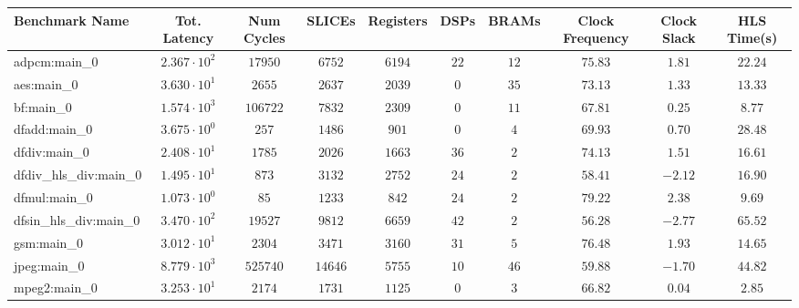 \begin{tabular}{|l|c|c|c|c|c|c|c|c|c|}
\hline
Benchmark Name          & Tot. Latency           & Num Cycles & SLICEs    & Registers & DSPs    & BRAMs   & Clock Frequency & Clock Slack & HLS Time(s) \\
\hline
adpcm:main\_0           & $ 2.367 \cdot 10^{2} $ & $ 17950  $ & $ 6752  $ & $ 6194  $ & $ 22  $ & $ 12  $ & $ 75.83       $ & $ 1.81    $ & $ 22.24   $ \\
aes:main\_0             & $ 3.630 \cdot 10^{1} $ & $ 2655   $ & $ 2637  $ & $ 2039  $ & $ 0   $ & $ 35  $ & $ 73.13       $ & $ 1.33    $ & $ 13.33   $ \\
bf:main\_0              & $ 1.574 \cdot 10^{3} $ & $ 106722 $ & $ 7832  $ & $ 2309  $ & $ 0   $ & $ 11  $ & $ 67.81       $ & $ 0.25    $ & $ 8.77    $ \\
dfadd:main\_0           & $ 3.675 \cdot 10^{0} $ & $ 257    $ & $ 1486  $ & $ 901   $ & $ 0   $ & $ 4   $ & $ 69.93       $ & $ 0.70    $ & $ 28.48   $ \\
dfdiv:main\_0           & $ 2.408 \cdot 10^{1} $ & $ 1785   $ & $ 2026  $ & $ 1663  $ & $ 36  $ & $ 2   $ & $ 74.13       $ & $ 1.51    $ & $ 16.61   $ \\
dfdiv\_hls\_div:main\_0 & $ 1.495 \cdot 10^{1} $ & $ 873    $ & $ 3132  $ & $ 2752  $ & $ 24  $ & $ 2   $ & $ 58.41       $ & $ -2.12   $ & $ 16.90   $ \\
dfmul:main\_0           & $ 1.073 \cdot 10^{0} $ & $ 85     $ & $ 1233  $ & $ 842   $ & $ 24  $ & $ 2   $ & $ 79.22       $ & $ 2.38    $ & $ 9.69    $ \\
dfsin\_hls\_div:main\_0 & $ 3.470 \cdot 10^{2} $ & $ 19527  $ & $ 9812  $ & $ 6659  $ & $ 42  $ & $ 2   $ & $ 56.28       $ & $ -2.77   $ & $ 65.52   $ \\
gsm:main\_0             & $ 3.012 \cdot 10^{1} $ & $ 2304   $ & $ 3471  $ & $ 3160  $ & $ 31  $ & $ 5   $ & $ 76.48       $ & $ 1.93    $ & $ 14.65   $ \\
jpeg:main\_0            & $ 8.779 \cdot 10^{3} $ & $ 525740 $ & $ 14646 $ & $ 5755  $ & $ 10  $ & $ 46  $ & $ 59.88       $ & $ -1.70   $ & $ 44.82   $ \\
mpeg2:main\_0           & $ 3.253 \cdot 10^{1} $ & $ 2174   $ & $ 1731  $ & $ 1125  $ & $ 0   $ & $ 3   $ & $ 66.82       $ & $ 0.04    $ & $ 2.85    $ \\

\end{tabular}
